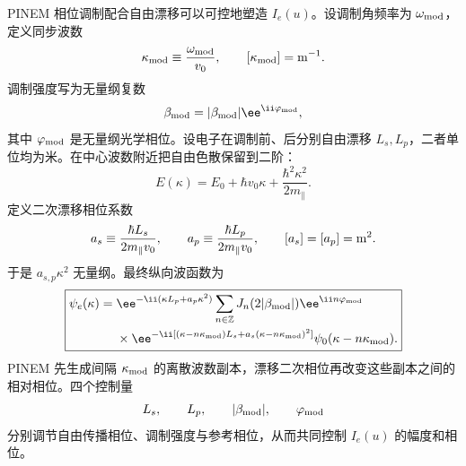 PINEM 相位调制配合自由漂移可以可控地塑造 $I_e(u)$。设调制角频率为 $\omega_{\rm mod}$，定义同步波数
\begin{equation*}
\kappa_{\rm mod}\equiv\frac{\omega_{\rm mod}}{v_0},
\qquad [\kappa_{\rm mod}]={\rm m^{-1}}.
\end{equation*}
调制强度写为无量纲复数
\begin{equation*}
\beta_{\rm mod}=|\beta_{\rm mod}|\ee^{\ii\varphi_{\rm mod}},
\end{equation*}
其中 $\varphi_{\rm mod}$ 是无量纲光学相位。设电子在调制前、后分别自由漂移 $L_s,L_p$，二者单位均为米。在中心波数附近把自由色散保留到二阶：
\begin{equation*}
E(\kappa)
=E_0+\hbar v_0\kappa
+\frac{\hbar^2\kappa^2}{2m_\parallel}.
\end{equation*}
定义二次漂移相位系数
\begin{equation*}
a_s\equiv\frac{\hbar L_s}{2m_\parallel v_0},
\qquad
a_p\equiv\frac{\hbar L_p}{2m_\parallel v_0},
\qquad
[a_s]=[a_p]={\rm m^2}.
\end{equation*}
于是 $a_{s,p}\kappa^2$ 无量纲。最终纵向波函数为
\begin{equation}
\boxed{
\begin{aligned}
\psi_e(\kappa)={}&
\ee^{-\ii(\kappa L_p+a_p\kappa^2)}
\sum_{n\in\mathbb Z}
J_n(2|\beta_{\rm mod}|)\ee^{\ii n\varphi_{\rm mod}}\\
&\times
\ee^{-\ii[(\kappa-n\kappa_{\rm mod})L_s
+a_s(\kappa-n\kappa_{\rm mod})^2]}
\psi_0(\kappa-n\kappa_{\rm mod}).
\end{aligned}}
\label{eq:shaped_electron_pinem_drift_wavefunction}
\end{equation}
PINEM 先生成间隔 $\kappa_{\rm mod}$ 的离散波数副本，漂移二次相位再改变这些副本之间的相对相位。四个控制量
\[
 L_s,\qquad L_p,\qquad |\beta_{\rm mod}|,\qquad \varphi_{\rm mod}
\]
分别调节自由传播相位、调制强度与参考相位，从而共同控制 $I_e(u)$ 的幅度和相位。

